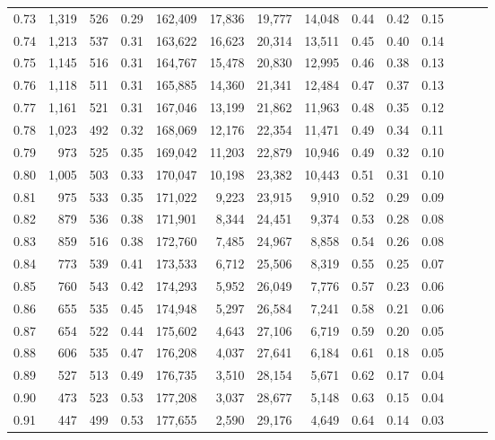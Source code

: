 \begin{tabular}{rrrrrrrrrrrrrr}
0.73 &  1,319 &  526 &  0.29 &  162,409 &   17,836 &  19,777 &  14,048 &  0.44 &  0.42 &      0.15 \\
0.74 &  1,213 &  537 &  0.31 &  163,622 &   16,623 &  20,314 &  13,511 &  0.45 &  0.40 &      0.14 \\
0.75 &  1,145 &  516 &  0.31 &  164,767 &   15,478 &  20,830 &  12,995 &  0.46 &  0.38 &      0.13 \\
0.76 &  1,118 &  511 &  0.31 &  165,885 &   14,360 &  21,341 &  12,484 &  0.47 &  0.37 &      0.13 \\
0.77 &  1,161 &  521 &  0.31 &  167,046 &   13,199 &  21,862 &  11,963 &  0.48 &  0.35 &      0.12 \\
0.78 &  1,023 &  492 &  0.32 &  168,069 &   12,176 &  22,354 &  11,471 &  0.49 &  0.34 &      0.11 \\
0.79 &    973 &  525 &  0.35 &  169,042 &   11,203 &  22,879 &  10,946 &  0.49 &  0.32 &      0.10 \\
0.80 &  1,005 &  503 &  0.33 &  170,047 &   10,198 &  23,382 &  10,443 &  0.51 &  0.31 &      0.10 \\
0.81 &    975 &  533 &  0.35 &  171,022 &    9,223 &  23,915 &   9,910 &  0.52 &  0.29 &      0.09 \\
0.82 &    879 &  536 &  0.38 &  171,901 &    8,344 &  24,451 &   9,374 &  0.53 &  0.28 &      0.08 \\
0.83 &    859 &  516 &  0.38 &  172,760 &    7,485 &  24,967 &   8,858 &  0.54 &  0.26 &      0.08 \\
0.84 &    773 &  539 &  0.41 &  173,533 &    6,712 &  25,506 &   8,319 &  0.55 &  0.25 &      0.07 \\
0.85 &    760 &  543 &  0.42 &  174,293 &    5,952 &  26,049 &   7,776 &  0.57 &  0.23 &      0.06 \\
0.86 &    655 &  535 &  0.45 &  174,948 &    5,297 &  26,584 &   7,241 &  0.58 &  0.21 &      0.06 \\
0.87 &    654 &  522 &  0.44 &  175,602 &    4,643 &  27,106 &   6,719 &  0.59 &  0.20 &      0.05 \\
0.88 &    606 &  535 &  0.47 &  176,208 &    4,037 &  27,641 &   6,184 &  0.61 &  0.18 &      0.05 \\
0.89 &    527 &  513 &  0.49 &  176,735 &    3,510 &  28,154 &   5,671 &  0.62 &  0.17 &      0.04 \\
0.90 &    473 &  523 &  0.53 &  177,208 &    3,037 &  28,677 &   5,148 &  0.63 &  0.15 &      0.04 \\
0.91 &    447 &  499 &  0.53 &  177,655 &    2,590 &  29,176 &   4,649 &  0.64 &  0.14 &      0.03 \\

\end{tabular}
